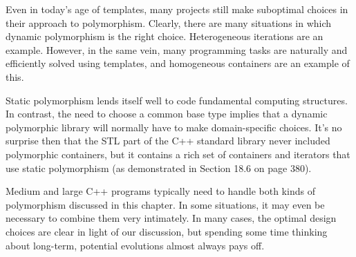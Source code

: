 Even in today’s age of templates, many projects still make suboptimal choices in their approach to polymorphism. Clearly, there are many situations in which dynamic polymorphism is the right choice. Heterogeneous iterations are an example. However, in the same vein, many programming tasks are naturally and efficiently solved using templates, and homogeneous containers are an example of this.

Static polymorphism lends itself well to code fundamental computing structures. In contrast, the need to choose a common base type implies that a dynamic polymorphic library will normally have to make domain-specific choices. It’s no surprise then that the STL part of the C++ standard library never included polymorphic containers, but it contains a rich set of containers and iterators that use static polymorphism (as demonstrated in Section 18.6 on page 380).

Medium and large C++ programs typically need to handle both kinds of polymorphism discussed in this chapter. In some situations, it may even be necessary to combine them very intimately. In many cases, the optimal design choices are clear in light of our discussion, but spending some time thinking about long-term, potential evolutions almost always pays off.






















